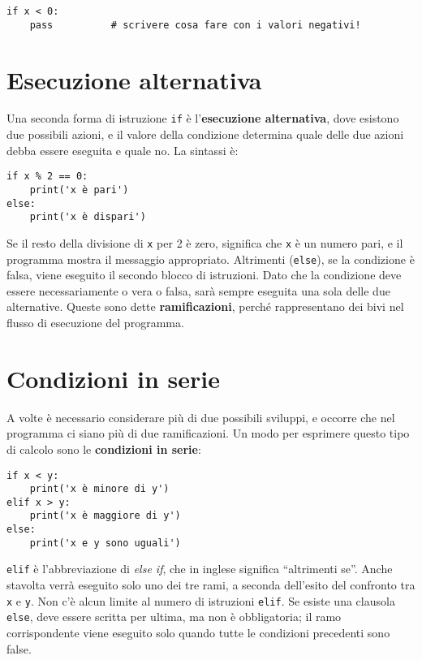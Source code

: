 \documentclass[10pt]{book}
\begin{document}
\begin{verbatim}
if x < 0:
    pass          # scrivere cosa fare con i valori negativi!
\end{verbatim}
%

\section{Esecuzione alternativa}
\label{alternative.execution}

Una seconda forma di istruzione {\tt if} è l'{\bf esecuzione alternativa},
dove esistono due possibili azioni, e il valore della condizione determina quale delle due azioni debba essere eseguita e quale no. La sintassi è:

\begin{verbatim}
if x % 2 == 0:
    print('x è pari')
else:
    print('x è dispari')
\end{verbatim}
%
Se il resto della divisione di {\tt x} per 2 è zero, significa che {\tt x} è un numero pari, e il programma mostra il messaggio appropriato. Altrimenti (\verb"else"), se la condizione è falsa, viene eseguito il secondo blocco di istruzioni. Dato che la condizione deve essere necessariamente o vera o falsa, sarà sempre eseguita una sola delle due alternative. Queste sono dette {\bf ramificazioni}, perché rappresentano dei bivi nel flusso di esecuzione del programma.


\section{Condizioni in serie}

A volte è necessario considerare più di due possibili sviluppi, e occorre che nel programma ci siano più di due ramificazioni. Un modo per esprimere questo tipo di calcolo sono le {\bf condizioni in serie}:

\begin{verbatim}
if x < y:
    print('x è minore di y')
elif x > y:
    print('x è maggiore di y')
else:
    print('x e y sono uguali')
\end{verbatim}
%
{\tt elif} è l'abbreviazione di {\em else if}, che in inglese significa ``altrimenti se''. Anche stavolta verrà eseguito solo uno dei tre rami, a seconda dell'esito del confronto tra {\tt x} e {\tt y}. Non c'è alcun limite al numero di istruzioni {\tt elif}. Se esiste una clausola {\tt else}, deve essere scritta per ultima, ma non è obbligatoria; il ramo corrispondente viene eseguito solo quando tutte le condizioni precedenti sono false.
\end{document}
